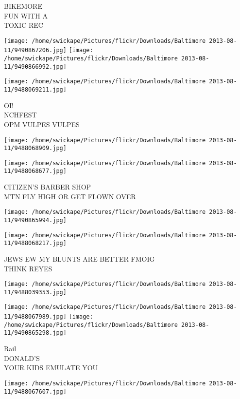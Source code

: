 \documentclass[10pt,letterpaper]{article}
\begin{document}
BIKEMORE\\
FUN WITH A\\
TOXIC REC
\pagebreak

\texttt{[image: /home/swickape/Pictures/flickr/Downloads/Baltimore 2013-08-11/9490867206.jpg]}
\texttt{[image: /home/swickape/Pictures/flickr/Downloads/Baltimore 2013-08-11/9490866992.jpg]}

\vspace{0.25in}
\texttt{[image: /home/swickape/Pictures/flickr/Downloads/Baltimore 2013-08-11/9488069211.jpg]}

OI!\\
NCHFEST\\
OPM VULPES VULPES
\pagebreak

\texttt{[image: /home/swickape/Pictures/flickr/Downloads/Baltimore 2013-08-11/9488068909.jpg]}

\vspace{0.25in}
\texttt{[image: /home/swickape/Pictures/flickr/Downloads/Baltimore 2013-08-11/9488068677.jpg]}

CITIZEN'S BARBER SHOP\\
MTN FLY HIGH OR GET FLOWN OVER
\pagebreak

\texttt{[image: /home/swickape/Pictures/flickr/Downloads/Baltimore 2013-08-11/9490865994.jpg]}

\vspace{0.25in}
\texttt{[image: /home/swickape/Pictures/flickr/Downloads/Baltimore 2013-08-11/9488068217.jpg]}

JEWS EW MY BLUNTS ARE BETTER FMOIG\\
THINK REYES
\pagebreak

\texttt{[image: /home/swickape/Pictures/flickr/Downloads/Baltimore 2013-08-11/9488039353.jpg]}

\vspace{0.25in}
\texttt{[image: /home/swickape/Pictures/flickr/Downloads/Baltimore 2013-08-11/9488067989.jpg]}
\texttt{[image: /home/swickape/Pictures/flickr/Downloads/Baltimore 2013-08-11/9490865298.jpg]}

Rail\\
DONALD'S\\
YOUR KIDS EMULATE YOU
\pagebreak

\texttt{[image: /home/swickape/Pictures/flickr/Downloads/Baltimore 2013-08-11/9488067607.jpg]}
\end{document}
